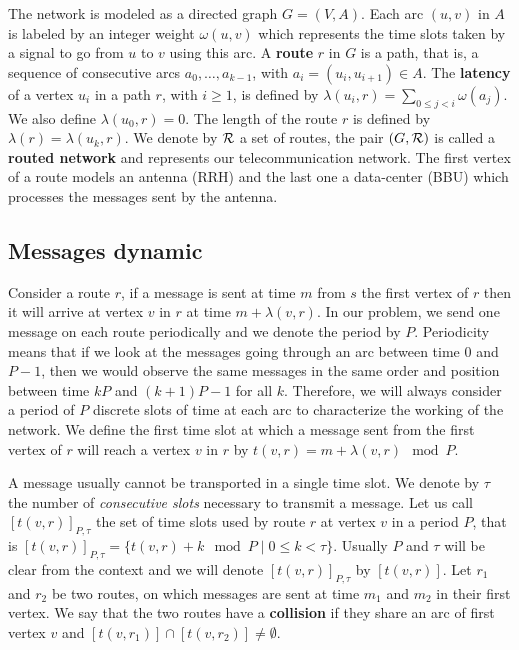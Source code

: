 \documentclass[10pt, conference, letterpaper]{IEEEtran}
\begin{document}
The network is modeled as a directed graph $G=(V,A)$. Each arc  $(u,v)$ in $A$ is labeled by an integer weight $\omega(u,v)$ which represents the time slots taken by a signal to go from $u$ to $v$ using this arc. A {\bf route} $r$ in $G$ is a path, that is, a sequence of consecutive arcs $a_0, \ldots , a_{k-1}$, with $a_i=(u_i,u_{i+1}) \in A$.  The {\bf latency} of a vertex $u_i$ in a path $r$, with $i \geq 1$, is defined by $\lambda(u_i,r)= \sum\limits_{0 \leq j <i} \omega(a_j)$. We also define $\lambda(u_0,r)=0$. The length of the route $r$ is defined by $\lambda (r)= \lambda (u_k,r)$.
We denote by $\cal R$ a set of routes, the pair $(G,\cal R)$ is called a {\bf routed network} and represents our telecommunication network.
The first vertex of a route models an antenna (RRH) and the last one a data-center (BBU) which processes the messages sent by the antenna.


   \subsection{Messages dynamic}
      
      Consider a route $r$, if a message is sent at time $m$ from $s$ the first vertex of $r$ then it will arrive at vertex $v$ in $r$ at time $m + \lambda(v,r)$. In our problem, we send one message on each route periodically and we denote the period by $P$.
      Periodicity means that if we look at the messages going through an arc between time $0$ and $P-1$, then we would observe the same messages in the same order and position between time $kP$ and $(k+1)P -1$ for all $k$. 
      Therefore, we will always consider a period of $P$ discrete slots of time at each arc to characterize the working of the network. We define the first time slot at which a message sent from the first vertex of $r$ will reach a vertex $v$ in $r$ by $t(v,r) = m + \lambda(v,r) \mod P$. 
      
      A message usually cannot be transported in a single time slot. We denote by $\tau$ the number 
      of \emph{consecutive slots} necessary to transmit a message. Let us call $[t(v,r)]_{P,\tau}$ the set of time slots used by route $r$ at vertex $v$ in a period $P$, that is $[t(v,r)]_{P,\tau} = \{t(v,r) + k \mod P \mid 0 \leq k < \tau \}$. Usually $P$ and $\tau$ will be clear from the context and we will denote $[t(v,r)]_{P,\tau}$ by $[t(v,r)]$.
      Let $r_1$ and $r_2$ be two routes, on which messages are sent at time $m_1$ and $m_2$ in their first vertex.
      We say that the two routes have a {\bf collision} if they share an arc of first vertex $v$ and $[t(v,r_{1})] \cap [t(v,r_{2})] \neq \emptyset$.
      
\end{document}
